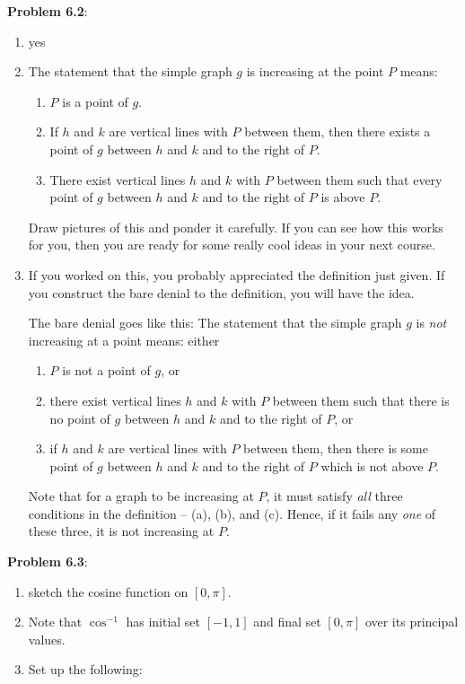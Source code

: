 \documentclass[english]{book}
\begin{document}
\textbf{Problem 6.2}:
\begin{enumerate}[\hspace{1cm}1)]
  \item yes
  \item The statement that the simple graph $g$ is increasing at the point $P$ means:
    \begin{enumerate}[\hspace{1cm}a)]
      \item $P$ is a point of $g$.
      \item If $h$ and $k$ are vertical lines with $P$ between them, then there exists a point of $g$ between $h$ and $k$ and to the right of $P$.
      \item There exist vertical lines $h$ and $k$ with $P$ between them such that every point of $g$ between $h$ and $k$ and to the right of $P$ is above $P$.
    \end{enumerate}
    Draw pictures of this and ponder it carefully. If you can see how this works for you, then you are ready for some really cool ideas in your next course.
  \item If you worked on this, you probably appreciated the definition just given. If you construct the bare denial to the definition, you will have the idea.

        The bare denial goes like this: The statement that the simple graph $g$ is \emph{not} increasing at a point means: either 
    \begin{enumerate}[\hspace{1cm}a)]
      \item $P$ is not a point of $g$, or
      \item there exist vertical lines $h$ and $k$ with $P$ between them such that there is no point of $g$ between $h$ and $k$ and to the right of $P$, or 
      \item if $h$ and $k$ are vertical lines with $P$ between them, then there is some point of $g$ between $h$ and $k$ and to the right of $P$ which is not above $P$.
    \end{enumerate}
        Note that for a graph to be increasing at $P$, it must satisfy \emph{all} three conditions in the definition -- (a), (b), and (c). Hence, if it fails any \emph{one} of these three, it is not increasing at $P$.
\end{enumerate}

\textbf{Problem 6.3}:
\begin{enumerate}[\hspace{1cm}1)]
  \item sketch the cosine function on $[0,\pi]$.
  \item Note that $\cos^{-1}$ has initial set $[-1,1]$ and final set $[0,\pi]$ over its principal values.
  \item Set up the following:
\end{enumerate}
\end{document}
